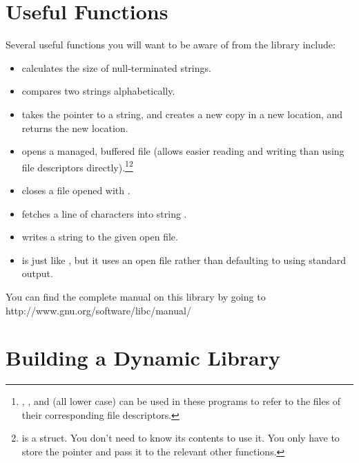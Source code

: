 \section{Useful Functions}

Several useful functions you will want to be aware of from the 
library include:

\begin{itemize}\item {} calculates the size of null-terminated strings. 
\item {} compares two strings alphabetically. 
\item {} takes the pointer to a string, and creates a new copy in a new location, and returns the new location. 
\item {} opens a managed, buffered file (allows easier reading and writing than using file descriptors directly).\footnote{, , and  (all lower case) can be used in these programs to refer to the files of their corresponding file descriptors.}\footnote{ is a struct.  You don't need to know its contents to use it.  You only have to store the pointer and pass it to the relevant other functions.} 
\item {} closes a file opened with . 
\item {} fetches a line of characters into string . 
\item {} writes a string to the given open file. 
\item {} is just like , but it uses an open file rather than defaulting to using standard output. 
\end{itemize}

You can find the complete manual on this library by going to http://www.gnu.org/software/libc/manual/

\section{Building a Dynamic Library}

